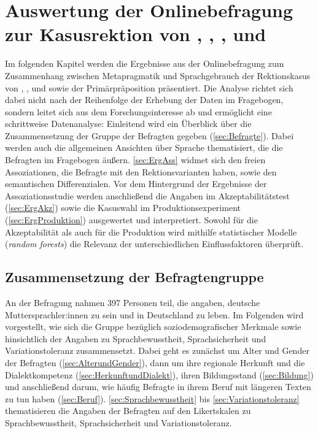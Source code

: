 \chapter[Auswertung der Onlinebefragung zur Kasusrektion]{Auswertung der Onlinebefragung zur Kasusrektion von , , ,  und }
\label{cha:Ergebnisse}
\largerpage[2]
Im folgenden Kapitel werden die Ergebnisse aus der Onlinebefragung zum Zusammenhang zwischen Metapragmatik und Sprachgebrauch der Rektionskasus von \wegen, \waehrend, \dank{} und \gegenueber{} sowie der Primärpräposition  präsentiert. 
Die Analyse richtet sich dabei nicht nach der Reihenfolge der Erhebung der Daten im Fragebogen, sondern leitet sich aus dem Forschungsinteresse ab und ermöglicht eine schrittweise Datenanalyse:
Einleitend wird ein Überblick über die Zusammensetzung der Gruppe der Befragten gegeben (\autoref{sec:Befragte}).
Dabei werden auch die allgemeinen Ansichten über Sprache thematisiert, die die Befragten im Fragebogen äußern. 
\autoref{sec:ErgAss} widmet sich den freien Assoziationen, die Befragte mit den Rektionsvarianten haben, sowie den semantischen Differenzialen. 
Vor dem Hintergrund der Ergebnisse der Assoziationsstudie werden anschließend die Angaben im Akzeptabilitätstest (\autoref{sec:ErgAkz}) sowie die Kasuswahl im Produktionsexperiment (\autoref{sec:ErgProduktion}) ausgewertet und interpretiert. %
Sowohl für die Akzeptabilität als auch für die Produktion wird mithilfe statistischer Modelle (\textit{random forests}) die Relevanz der unterschiedlichen Einflussfaktoren überprüft.%
\section{Zusammensetzung der Befragtengruppe}
\label{sec:Befragte}
An der Befragung nahmen 397 Personen teil, die angaben, deutsche Muttersprachler:innen zu sein und in Deutschland zu leben. 
Im Folgenden wird vorgestellt, wie sich die Gruppe bezüglich soziodemografischer Merkmale sowie hinsichtlich der Angaben zu Sprachbewusstheit, Sprachsicherheit und Variationstoleranz zusammensetzt. 
Dabei geht es zunächst um Alter und Gender der Befragten (\autoref{sec:AlterundGender}), dann um ihre regionale Herkunft und die Dialektkompetenz (\autoref{sec:HerkunftundDialekt}), ihren Bildungsstand (\autoref{sec:Bildung}) und anschließend darum, wie häufig Befragte in ihrem Beruf mit längeren Texten zu tun haben (\autoref{sec:Beruf}). 
\autoref{sec:Sprachbewusstheit} bis \autoref{sec:Variationstoleranz} thematisieren die Angaben der Befragten auf den Likertskalen zu Sprachbewusstheit, Sprachsicherheit und Variationstoleranz.  
